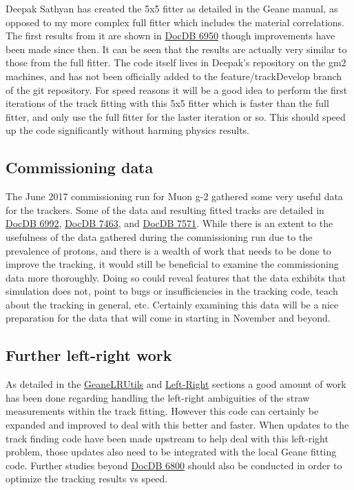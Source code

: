 		Deepak Sathyan has created the 5x5 fitter as detailed in the Geane manual, as opposed to my more complex full fitter which includes the material correlations. The first results from it are shown in \href{https://gm2-docdb.fnal.gov/cgi-bin/private/ShowDocument?docid=6950}{DocDB 6950} though improvements have been made since then. It can be seen that the results are actually very similar to those from the full fitter. The code itself lives in Deepak's repository on the gm2 machines, and has not been officially added to the feature/trackDevelop branch of the git repository. For speed reasons it will be a good idea to perform the first iterations of the track fitting with this 5x5 fitter which is faster than the full fitter, and only use the full fitter for the laster iteration or so. This should speed up the code significantly without harming physics results.

	\subsection{Commissioning data}

		The June 2017 commissioning run for Muon g-2 gathered some very useful data for the trackers. Some of the data and resulting fitted tracks are detailed in \href{https://gm2-docdb.fnal.gov/cgi-bin/private/ShowDocument?docid=6992}{DocDB 6992}, \href{https://gm2-docdb.fnal.gov/cgi-bin/private/ShowDocument?docid=7463}{DocDB 7463}, and \href{https://gm2-docdb.fnal.gov/cgi-bin/private/ShowDocument?docid=7571}{DocDB 7571}. While there is an extent to the usefulness of the data gathered during the commissioning run due to the prevalence of protons, and there is a wealth of work that needs to be done to improve the tracking, it would still be beneficial to examine the commissioning data more thoroughly. Doing so could reveal features that the data exhibits that simulation does not, point to bugs or insufficiencies in the tracking code, teach about the tracking in general, etc. Certainly examining this data will be a nice preparation for the data that will come in starting in November and beyond.

	\subsection{Further left-right work}

		As detailed in the \hyperref[sec:GeaneLRUtils]{GeaneLRUtils} and \hyperref[sec:LR]{Left-Right} sections a good amount of work has been done regarding handling the left-right ambiguities of the straw measurements within the track fitting. However this code can certainly be expanded and improved to deal with this better and faster. When updates to the track finding code have been made upstream to help deal with this left-right problem, those updates also need to be integrated with the local Geane fitting code. Further studies beyond \href{https://gm2-docdb.fnal.gov/cgi-bin/private/ShowDocument?docid=6800}{DocDB 6800} should also be conducted in order to optimize the tracking results vs speed.

